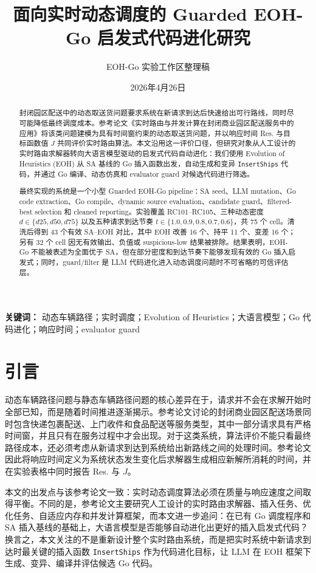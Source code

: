 \documentclass[UTF8,11pt]{ctexart}
\title{面向实时动态调度的 Guarded EOH-Go 启发式代码进化研究}
\author{EOH-Go 实验工作区整理稿}
\date{2026年4月26日}
\begin{document}
\maketitle

\begin{abstract}
封闭园区配送中的动态取送货问题要求系统在新请求到达后快速给出可行路线，同时尽可能降低最终调度成本。参考论文《实时路由与并发计算在封闭商业园区配送服务中的应用》将该类问题建模为具有时间窗约束的动态取送货问题，并以响应时间 Res. 与目标函数值 $J$ 共同评价实时路由算法。本文沿用这一评价口径，但研究对象从人工设计的实时路由求解器转向大语言模型驱动的启发式代码自动进化：我们使用 Evolution of Heuristics (EOH) 从 SA 基线的 Go 插入函数出发，自动生成和变异 \texttt{InsertShips} 代码，并通过 Go 编译、动态仿真和 evaluator guard 对候选代码进行筛选。

最终实现的系统是一个小型 Guarded EOH-Go pipeline：SA seed、LLM mutation、Go code extraction、Go compile、dynamic source evaluation、candidate guard、filtered-best selection 和 cleaned reporting。实验覆盖 RC101--RC105、三种动态密度 $d\in\{d25,d50,d75\}$ 以及五种请求到达节奏 $t\in\{1.0,0.9,0.8,0.7,0.6\}$，共 75 个 cell。清洗后得到 43 个有效 SA--EOH 对比，其中 EOH 改善 16 个、持平 11 个、变差 16 个；另有 32 个 cell 因无有效输出、负值或 suspicious-low 结果被排除。结果表明，EOH-Go 不能被表述为全面优于 SA，但在部分密度和到达节奏下能够发现有效的 Go 插入启发式；同时，guard/filter 是 LLM 代码进化进入动态调度问题时不可省略的可信评估层。
\end{abstract}

\noindent\textbf{关键词：} 动态车辆路径；实时调度；Evolution of Heuristics；大语言模型；Go 代码进化；响应时间；evaluator guard

\section{引言}
动态车辆路径问题与静态车辆路径问题的核心差异在于，请求并不会在求解开始时全部已知，而是随着时间推进逐渐揭示。参考论文讨论的封闭商业园区配送场景同时包含快递包裹配送、上门收件和食品配送等服务类型，其中一部分请求具有严格时间窗，并且只有在服务过程中才会出现。对于这类系统，算法评价不能只看最终路径成本，还必须考虑从新请求到达到系统给出新路线之间的处理时间。参考论文因此将响应时间定义为系统状态发生变化后求解器生成相应新解所消耗的时间，并在实验表格中同时报告 Res. 与 $J$。

本文的出发点与该参考论文一致：实时动态调度算法必须在质量与响应速度之间取得平衡。不同的是，参考论文主要研究人工设计的实时路由求解器、插入任务、优化任务、自适应内存和并发计算框架，而本文进一步追问：在已有 Go 调度程序和 SA 插入基线的基础上，大语言模型是否能够自动进化出更好的插入启发式代码？换言之，本文关注的不是重新设计整个实时路由系统，而是把实时系统中新请求到达时最关键的插入函数 \texttt{InsertShips} 作为代码进化目标，让 LLM 在 EOH 框架下生成、变异、编译并评估候选 Go 代码。
\end{document}
